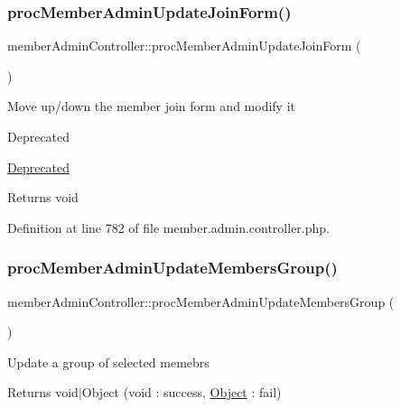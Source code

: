 \mbox{\label{classmemberAdminController_a7ace7e29b0cb0b6108ace990e9c9ec27}} 
\subsubsection{\texorpdfstring{proc\+Member\+Admin\+Update\+Join\+Form()}{procMemberAdminUpdateJoinForm()}}
{\footnotesize\ttfamily member\+Admin\+Controller\+::proc\+Member\+Admin\+Update\+Join\+Form (\begin{DoxyParamCaption}{ }\end{DoxyParamCaption})}

Move up/down the member join form and modify it \begin{DoxyRefDesc}{Deprecated}
\item[\hyperlink{deprecated__deprecated000022}{Deprecated}]\end{DoxyRefDesc}
\begin{DoxyReturn}{Returns}
void 
\end{DoxyReturn}


Definition at line 782 of file member.\+admin.\+controller.\+php.

\mbox{\label{classmemberAdminController_a5d65dac896cd8e9772a9f41d34a540b1}} 
\subsubsection{\texorpdfstring{proc\+Member\+Admin\+Update\+Members\+Group()}{procMemberAdminUpdateMembersGroup()}}
{\footnotesize\ttfamily member\+Admin\+Controller\+::proc\+Member\+Admin\+Update\+Members\+Group (\begin{DoxyParamCaption}{ }\end{DoxyParamCaption})}

Update a group of selected memebrs \begin{DoxyReturn}{Returns}
void$\vert$\+Object (void \+: success, \hyperlink{classObject}{Object} \+: fail) 
\end{DoxyReturn}


